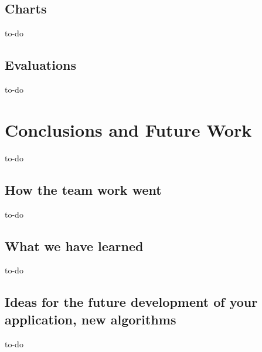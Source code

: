 \documentclass[a4paper,12pt]{article}
\begin{document}
\subsection{Charts}
to-do
\subsection{Evaluations}
to-do

\section{Conclusions and Future Work}
to-do
\subsection{How the team work went}
to-do
\subsection{What we have learned}
to-do
\subsection{Ideas for the future development of your application, new algorithms}
to-do
\end{document}
